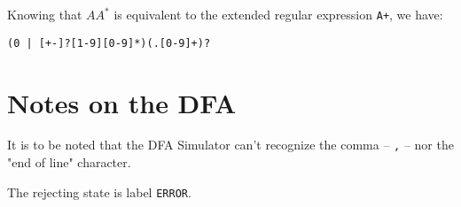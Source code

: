 \documentclass[a4paper,11pt]{article}
\begin{document}
Knowing that \texttt{$AA^*$} is equivalent to the extended regular expression \texttt{A+}, we have:
\begin{center}
	\texttt{(0 | [+-]?[1-9][0-9]*)(.[0-9]+)?}
\end{center}


\section{Notes on the DFA}
It is to be noted that the DFA Simulator can't recognize the comma -- \texttt{,} --
nor the "end of line" character.

The rejecting state is label \texttt{ERROR}.
\end{document}
